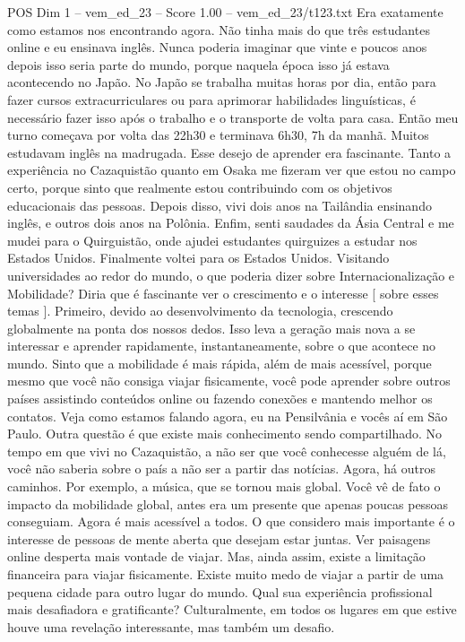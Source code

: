 \begin{textsample}{POS Dim 1 – vem\_ed\_23 – Score 1.00 – vem\_ed\_23/t123.txt}
Era exatamente como estamos nos encontrando agora.
Não tinha mais do que três estudantes online e eu ensinava inglês.
Nunca poderia imaginar que vinte e poucos anos depois isso seria parte do mundo, porque naquela época isso já estava acontecendo no Japão.
No Japão se trabalha muitas horas por dia, então para fazer cursos extracurriculares ou para aprimorar habilidades linguísticas, é necessário fazer isso após o trabalho e o transporte de volta para casa.
Então meu turno começava por volta das 22h30 e terminava 6h30, 7h da manhã.
Muitos estudavam inglês na madrugada.
Esse desejo de aprender era fascinante.
Tanto a experiência no Cazaquistão quanto em Osaka me fizeram ver que estou no campo certo, porque sinto que realmente estou contribuindo com os objetivos educacionais das pessoas.
Depois disso, vivi dois anos na Tailândia ensinando inglês, e outros dois anos na Polônia.
Enfim, senti saudades da Ásia Central e me mudei para o Quirguistão, onde ajudei estudantes quirguizes a estudar nos Estados Unidos.
Finalmente voltei para os Estados Unidos.
Visitando universidades ao redor do mundo, o que poderia dizer sobre Internacionalização e Mobilidade?
Diria que é fascinante ver o crescimento e o interesse [ sobre esses temas ].
Primeiro, devido ao desenvolvimento da tecnologia, crescendo globalmente na ponta dos nossos dedos.
Isso leva a geração mais nova a se interessar e aprender rapidamente, instantaneamente, sobre o que acontece no mundo.
Sinto que a mobilidade é mais rápida, além de mais acessível, porque mesmo que você não consiga viajar fisicamente, você pode aprender sobre outros países assistindo conteúdos online ou fazendo conexões e mantendo melhor os contatos.
Veja como estamos falando agora, eu na Pensilvânia e vocês aí em São Paulo.
Outra questão é que existe mais conhecimento sendo compartilhado.
No tempo em que vivi no Cazaquistão, a não ser que você conhecesse alguém de lá, você não saberia sobre o país a não ser a partir das notícias.
Agora, há outros caminhos.
Por exemplo, a música, que se tornou mais global.
Você vê de fato o impacto da mobilidade global, antes era um presente que apenas poucas pessoas conseguiam.
Agora é mais acessível a todos.
O que considero mais importante é o interesse de pessoas de mente aberta que desejam estar juntas.
Ver paisagens online desperta mais vontade de viajar.
Mas, ainda assim, existe a limitação financeira para viajar fisicamente.
Existe muito medo de viajar a partir de uma pequena cidade para outro lugar do mundo.
Qual sua experiência profissional mais desafiadora e gratificante?
Culturalmente, em todos os lugares em que estive houve uma revelação interessante, mas também um desafio.

\end{textsample}
